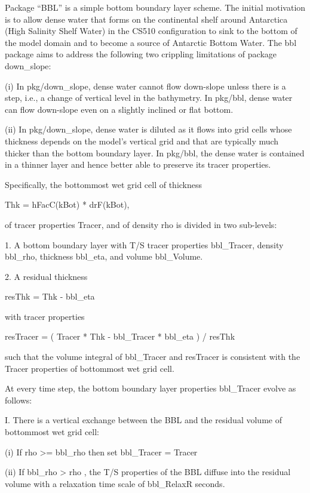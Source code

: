 
Package ``BBL'' is a simple bottom boundary layer scheme.  The initial
motivation is to allow dense water that forms on the continental shelf around
Antarctica (High Salinity Shelf Water) in the CS510 configuration to sink to
the bottom of the model domain and to become a source of Antarctic Bottom
Water.  The bbl package aims to address the following two crippling limitations of
package down_slope:

(i) In pkg/down_slope, dense water cannot flow down-slope unless there is a
step, i.e., a change of vertical level in the bathymetry.  In pkg/bbl, dense
water can flow down-slope even on a slightly inclined or flat bottom.

(ii) In pkg/down_slope, dense water is diluted as it flows into grid cells
whose thickness depends on the model's vertical grid and that are typically
much thicker than the bottom boundary layer.  In pkg/bbl, the dense water is
contained in a thinner layer and hence better able to preserve its tracer
properties.

Specifically, the bottommost wet grid cell of thickness

         Thk = hFacC(kBot) * drF(kBot),

of tracer properties Tracer, and of density rho is divided in two sub-levels:

1. A bottom boundary layer with T/S tracer properties bbl_Tracer, density
bbl_rho, thickness bbl_eta, and volume bbl_Volume.

2. A residual thickness

         resThk = Thk - bbl_eta

with tracer properties

         resTracer = ( Tracer * Thk - bbl_Tracer * bbl_eta ) / resThk

such that the volume integral of bbl_Tracer and resTracer is consistent with
the Tracer properties of bottommost wet grid cell.

At every time step, the bottom boundary layer properties bbl_Tracer evolve as
follows:

I. There is a vertical exchange between the BBL and the residual volume of
bottommost wet grid cell:

(i) If rho >= bbl_rho then set bbl_Tracer = Tracer

(ii) If bbl_rho > rho , the T/S properties of the BBL diffuse into the
residual volume with a relaxation time scale of bbl_RelaxR seconds.

